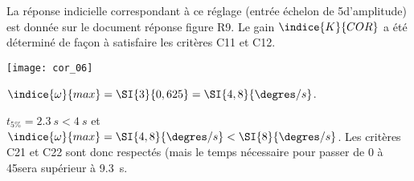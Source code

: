 La réponse indicielle correspondant à ce réglage (entrée échelon de 5\degres d’amplitude) est donnée sur le document réponse figure R9. Le gain $\indice{K}{COR}$ a été déterminé de façon à satisfaire les critères C11 et C12.

\ifprof
\begin{corrige}
\begin{center}
\texttt{[image: cor\_06]}
\end{center}
$\indice{\omega}{max} = \SI{3}{0,625}=\SI{4,8}{\degres/s}$.
\end{corrige}
\else
\fi


\ifprof
\begin{corrige}

$t_{5\%}=\SI{2,3}{s}<\SI{4}{s}$ et $\indice{\omega}{max} = \SI{4,8}{\degres/s}<\SI{8}{\degres/s}$. 
Les critères C21 et C22 sont donc respectés (mais le temps nécessaire pour passer de 0 à 45\degres sera supérieur à \SI{9,3}{s}. 


\end{corrige}
\else
\fi

